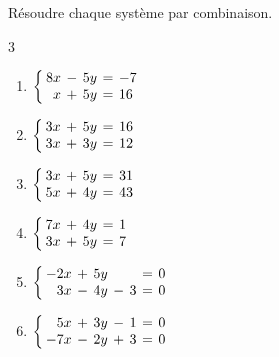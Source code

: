 \exo

Résoudre chaque système par combinaison.
\vspace{-6pt}
\setlength{\columnsep}{1cm}
\setlength{\columnseprule}{0pt}
\begin{multicols}{3}
\begin{enumerate}
\item $\left\{\setlength\arraycolsep{2pt}\begin{array}{rcrcl}
8x & - & 5y & = & -7 \\
x & + & 5y & = & 16
\end{array}\right.$
\medskip
\item $\left\{\setlength\arraycolsep{2pt}\begin{array}{rcrcl}
3x & + & 5y & = & 16 \\
3x & + & 3y & = & 12
\end{array}\right.$
\item $\left\{\setlength\arraycolsep{2pt}\begin{array}{rcrcl}
3x & + & 5y & = & 31 \\
5x & + & 4y & = & 43
\end{array}\right.$
\medskip
\item $\left\{\setlength\arraycolsep{2pt}\begin{array}{rcrcl}
7x & + & 4y & = & 1 \\
3x & + & 5y & = & 7
\end{array}\right.$
\item $\left\{\setlength\arraycolsep{2pt}\begin{array}{rcrcrcl}
-2x & + & 5y &  &  & = & 0 \\
3x & - & 4y & - & 3 & = & 0
\end{array}\right.$
\medskip
\item $\left\{\setlength\arraycolsep{2pt}\begin{array}{rcrcrcl}
5x & + & 3y & - & 1 & = & 0 \\
-7x & - & 2y & + & 3 & = & 0
\end{array}\right.$
\end{enumerate}
\end{multicols}
\vspace{-6pt}

\exo

